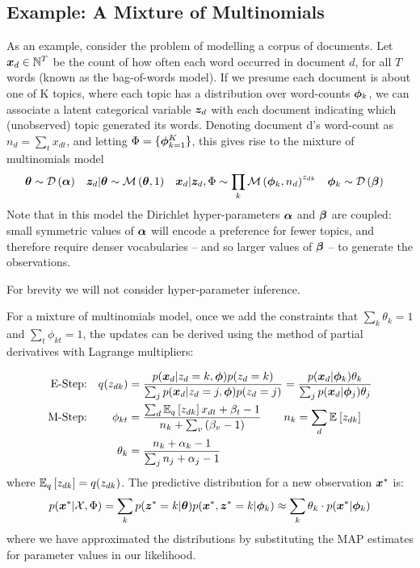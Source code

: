 \subsection*{Example: A Mixture of Multinomials}
As an example, consider the problem of modelling a corpus of documents. Let $\xd \in \mathbb{N}^T$ be the count of how often each word occurred in document $d$, for all $T$ words (known as the bag-of-words model). If we presume each document is about one of K topics, where each topic has a distribution over word-counts $\vv{\phi}_k$, we can associate a latent categorical variable $\vv{z}_d$ with each document indicating which (unobserved) topic generated its words. Denoting document d's word-count as $n_d = \sum_t x_{dt}$, and letting $\params = \{ \vv{\phi}_{k=1}^K \}$, this gives rise to the mixture of multinomials model\cite{Nigam2000}
\begin{align}
\vv{\theta} & \sim \dir{\vv{\alpha}} &
\zd|\vv{\theta} & \sim \muln{\vv{\theta}}{1} & 
\xd|\zd, \params & \sim \prod_k \muln{\param_k}{n_d}^{z_{dk}} & 
\param_k & \sim \dir{\vv{\beta}}
\end{align}
Note that in this model the Dirichlet hyper-parameters $\vv{\alpha}$ and $\vv{\beta}$ are coupled: small symmetric values of $\vv{\alpha}$ will encode a preference for fewer topics, and therefore require denser vocabularies -- and so larger values of $\vv{\beta}$ -- to generate the observations. 

For brevity we will not consider hyper-parameter inference. 

For a mixture of multinomials model, once we add the constraints that $\sum_k \theta_k = 1$ and $\sum_t \phi_{kt} = 1$, the updates can be derived using the method of partial derivatives with Lagrange multipliers:


\begin{align}
\text{E-Step:} & & q(z_{dk}) 
& = \frac{p(\xd|z_d = k, \param)p(z_d = k)}{\sum_j p(\xd|z_d = j, \param)p(z_d = j)} 
= \frac{p(\xd | \param_k) \theta_k}{\sum_j p(\xd | \param_j) \theta_j} \label{eqn:mom-estep} \\
\text{M-Step:} 
& & \phi_{kt} & =
    \frac{
        \sum_d \ex{z_{dk}}{q}x_{dt} + \beta_t - 1
    }{
        n_k + \sum_v \left( \beta_v - 1 \right)
    } \qquad n_k = \sum_d \ex{z_{dk}}{} \\
& & \theta_k & =  
    \frac{
        n_k + \alpha_k - 1
    }{
        \sum_j n_j + \alpha_j - 1
    } \label{eqn:mom-mstep}
\end{align}
where $\ex{z_{dk}}{q} = q(z_{dk})$. The predictive distribution for a new observation $\xnew$ is:
\begin{align}
p(\xnew | \xdat, \params)  = \sum_k p(\znew = k | \vv{\theta}) p(\xnew, \znew = k | \param_k) 
\approx \sum_k \theta_k \cdot p(\xnew | \param_k)
\end{align}
where we have approximated the distributions by substituting the MAP estimates for parameter values in our likelihood.

